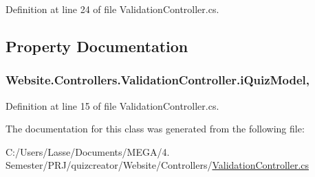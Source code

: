 Definition at line 24 of file Validation\+Controller.\+cs.



\subsection{Property Documentation}
\hypertarget{class_website_1_1_controllers_1_1_validation_controller_ae08cdf74da170febad8d02f9911b2f28}{}
\subsubsection[{i\+Quiz\+Model}]{ Website.\+Controllers.\+Validation\+Controller.\+i\+Quiz\+Model\hspace{0.3cm}{\ttfamily [get]}, {\ttfamily [set]}}\label{class_website_1_1_controllers_1_1_validation_controller_ae08cdf74da170febad8d02f9911b2f28}


Definition at line 15 of file Validation\+Controller.\+cs.



The documentation for this class was generated from the following file\+:\begin{DoxyCompactItemize}
\item 
C\+:/\+Users/\+Lasse/\+Documents/\+M\+E\+G\+A/4. Semester/\+P\+R\+J/quizcreator/\+Website/\+Controllers/\hyperlink{_validation_controller_8cs}{Validation\+Controller.\+cs}\end{DoxyCompactItemize}
